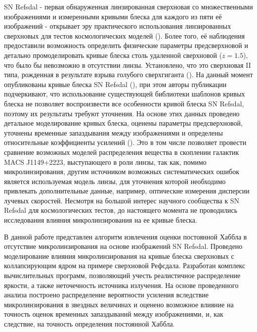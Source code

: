SN Refsdal - первая обнаруженная линзированная сверхновая со множественными изображениями и измеренными кривыми блеска для каждого из пяти её изображений - открывает эру практического использования линзированных сверхновых для тестов космологических моделей (\cite{grillo2018}). Более того, её наблюдения предоставили возможность определить физические параметры предсверхновой и детально промоделировать кривые блеска столь удаленной сверхновой ($z = 1.5$), что было бы невозможно в отсутствии линзы. Установлено, что это сверхновая II типа, рожденная в результате взрыва голубого сверхгиганта (\cite{kelly2016}). На данный момент опубликованы кривые блеска SN Refsdal (\cite{rodney2016}), при этом авторы публикации подчеркивают, что использование существующей библиотеки шаблонов кривых блеска не позволяет воспроизвести все особенности кривой блеска SN Refsdal, поэтому их результаты требуют уточнения. На основе этих данных проведено детальное моделирование кривых блеска, оценены параметры предсверхновой, уточнены временные запаздывания между изображениями и определены относительные коэффициенты усилений (\cite{petrnat2020}). Это в том числе позволяет провести сравнение возможных моделей распределения вещества в скоплении галактик MACS J1149+2223, выступающего в роли линзы, так как, помимо микролинзирования, другим источником возможных систематических ошибок является используемая модель линзы, для уточнения которой необходимо привлекать дополнительные данные, например, оптические измерения дисперсии лучевых скоростей. %
Несмотря на большой интерес научного сообщества к SN Refsdal для космологических тестов, до настоящего момента не проводились исследования влияния микролинзирования на ее кривые блеска.

В данной работе представлен алгоритм извлечения оценки постоянной Хаббла в отсутствие микролинзирования на основе изображений SN Refsdal. %
Проведено моделирование влияния микролинзирования на кривые блеска сверхновых с коллапсирующим ядром на примере сверхновой Рефсдала. Разработан комплекс вычислительных программ, позволяющий учесть реалистичное распределение яркости, а также неточечность источника излучения. На основе проведенного анализа построено распределение вероятности усиления вследствие микролинзирования в звездных величинах и оценено возможное влияние на точность оценок временных запаздываний между изображениями, и, как следствие, на точность определения постоянной Хаббла.


